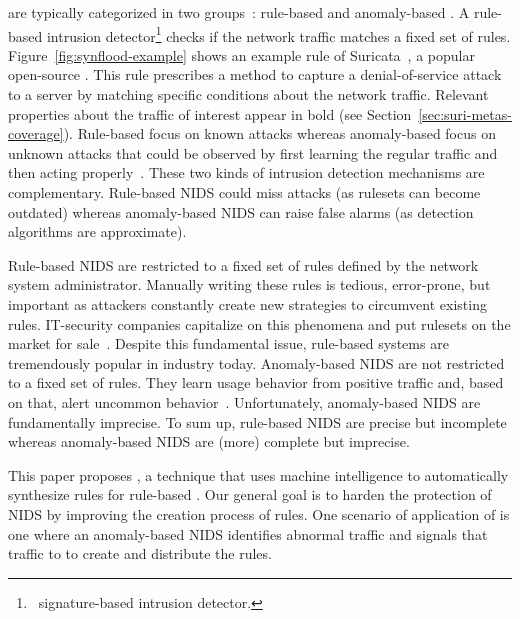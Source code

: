 \documentclass[runningheads]{llncs}
\begin{document}
\sloppy \nids{} are typically categorized in two
groups~\cite{kumar2007survey}: rule-based and anomaly-based \nids. A
rule-based intrusion detector\footnote{\aka\ signature-based intrusion
  detector.} checks if the network traffic matches a fixed set of
rules. Figure~\ref{fig:synflood-example} shows an example rule of
Suricata~\cite{suricata}, a popular open-source \nids{}. This rule
prescribes a method to capture a denial-of-service
attack~\cite{understanding-dos} to a server by matching specific
conditions about the network traffic. Relevant properties about the
traffic of interest appear in bold (see
Section~\ref{sec:suri-metas-coverage}). Rule-based \nids{} focus on
known attacks whereas anomaly-based \nids{} focus on unknown attacks
that could be observed by first learning the regular traffic and then
acting
properly~\cite{kumar2007survey,Mitchell:2014:SID:2597757.2542049,cordy-etal-issta19}. These
two kinds of intrusion detection mechanisms are
complementary. Rule-based NIDS could miss attacks (as rulesets can
become outdated) whereas anomaly-based NIDS can raise false alarms (as
detection algorithms are approximate).

Rule-based NIDS are restricted to a fixed set of rules defined by the
network system administrator. Manually writing these rules is tedious,
error-prone, but important as attackers constantly create new
strategies to circumvent existing rules. IT-security companies
capitalize on this phenomena and put rulesets on the market for
sale~\cite{proofpoint-etpro,snort-rule-subscriptions}.  Despite this
fundamental issue, rule-based systems are tremendously popular in
industry today. Anomaly-based NIDS are not restricted to a fixed set
of rules. They learn usage behavior from positive traffic and, based
on that, alert uncommon behavior~\cite{7579764}. Unfortunately,
anomaly-based NIDS are fundamentally imprecise. To sum up, rule-based
NIDS are precise but incomplete whereas anomaly-based NIDS are (more)
complete but imprecise.


This paper proposes \tname{}, a technique that uses machine
intelligence to automatically synthesize rules for rule-based
\nids. Our general goal is to harden the protection of NIDS by
improving the creation process of rules. One scenario of application
of \tname{} is one where an anomaly-based NIDS identifies abnormal
traffic and signals that traffic to \tname{} to create and distribute
the rules.
\end{document}
